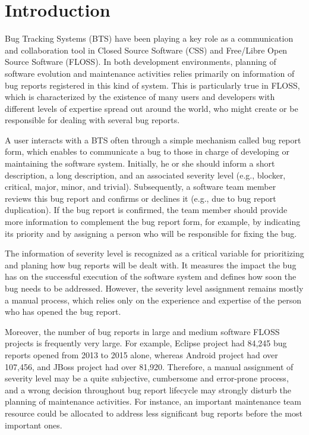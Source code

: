 \section{Introduction}\label{sec:introduction}

Bug Tracking Systems (BTS) have been playing a key role as a communication and collaboration tool in Closed Source Software (CSS) and Free/Libre Open Source Software (FLOSS). In both development environments, planning of software evolution and maintenance activities relies primarily on information of bug reports registered in this kind of system. This is particularly true in FLOSS, which is characterized by the existence of many users and developers with different levels of expertise spread out around the world, who might create or be responsible for dealing with several bug reports\cite{Cavalcanti:2014}. 

A user interacts with a BTS often through a simple mechanism called bug report form, which enables to communicate a bug to those in charge of developing or maintaining the software system\cite{Sommerville:2010}. Initially, he or she should inform a short description, a long description, and an associated severity level (e.g., blocker, critical, major, minor, and trivial). Subsequently, a software team member reviews this bug report and confirms or declines it (e.g., due to bug report duplication). If the bug report is confirmed, the team member should provide more information to complement the bug report form, for example, by indicating its priority and by assigning a person who will be responsible for fixing the bug. 

The information of severity level is recognized as a critical variable for prioritizing and planing how  bug reports will be dealt with\cite{Tian:2012}. It measures the impact the bug has on the successful execution of the software system and defines how soon the bug needs to be addressed\cite{Lamkanfi:2010}. However, the severity level assignment remains mostly a manual process, which relies only on the experience and expertise of the person who has opened the bug report\cite{Cavalcanti:2014, Tian:2012, Lamkanfi:2010}.  

Moreover, the number of bug reports in large and medium software FLOSS projects is frequently very large\cite{Yang:2017}. For example, Eclipse project had 84,245 bug reports opened from 2013 to 2015 alone, whereas Android project had over 107,456, and JBoss project had over 81,920. Therefore, a manual assignment of severity level may be a quite subjective, cumbersome and error-prone process, and a wrong decision throughout bug report lifecycle may strongly disturb the planning of maintenance activities. For instance, an important maintenance team resource could be allocated to address less significant bug reports before the most important ones.

